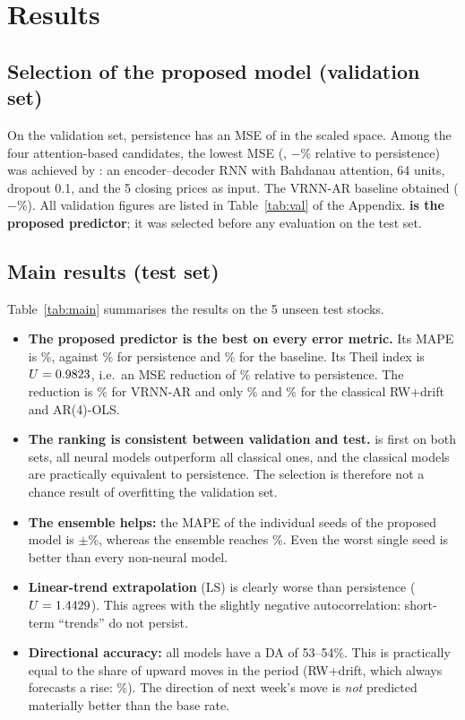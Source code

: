 \section{Results}
\label{sec:results}

\subsection{Selection of the proposed model (validation set)}
On the validation set, persistence has an MSE of \ValPersMSE{} in the scaled space. Among the four attention-based candidates, the lowest MSE (\ValPropMSE, $-$\ValPropGain\% relative to persistence) was achieved by \textbf{\PropName}: an encoder--decoder RNN with Bahdanau attention, 64 units, dropout 0.1, and the 5 closing prices as input. The VRNN-AR baseline obtained \ValVrnnMSE{} ($-$\ValVrnnGain\%). All validation figures are listed in Table~\ref{tab:val} of the Appendix. \textbf{\PropName{} is the proposed predictor}; it was selected before any evaluation on the test set.

\subsection{Main results (test set)}


Table~\ref{tab:main} summarises the results on the 5 unseen test stocks.
\begin{itemize}[leftmargin=*]
  \item \textbf{The proposed predictor is the best on every error metric.} Its MAPE is \PropMAPE\%, against \PersMAPE\% for persistence and \VrnnMAPE\% for the baseline. Its Theil index is $U=0.9823$, i.e.\ an MSE reduction of \PropGain\% relative to persistence. The reduction is \VrnnGain\% for VRNN-AR and only \DriftGain\% and \ArGain\% for the classical RW+drift and AR(4)-OLS.
  \item \textbf{The ranking is consistent between validation and test.} \PropName{} is first on both sets, all neural models outperform all classical ones, and the classical models are practically equivalent to persistence. The selection is therefore not a chance result of overfitting the validation set.
  \item \textbf{The ensemble helps:} the MAPE of the individual seeds of the proposed model is \PropSeedMAPE$\pm$\PropSeedMAPEsd\%, whereas the ensemble reaches \PropMAPE\%. Even the worst single seed is better than every non-neural model.
  \item \textbf{Linear-trend extrapolation} (LS) is clearly worse than persistence ($U=1.4429$). This agrees with the slightly negative autocorrelation: short-term ``trends'' do not persist.
  \item \textbf{Directional accuracy:} all models have a DA of 53--54\%. This is practically equal to the share of upward moves in the period (RW+drift, which always forecasts a rise: \DriftDA\%). The direction of next week's move is \emph{not} predicted materially better than the base rate.
\end{itemize}

